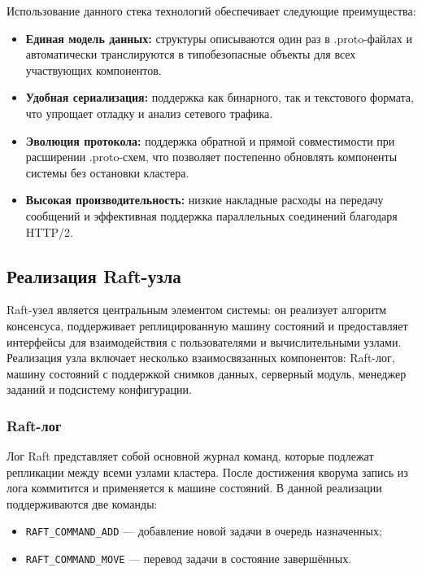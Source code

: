 Использование данного стека технологий обеспечивает следующие преимущества:
\begin{itemize}
    \item \textbf{Единая модель данных:} структуры описываются
    один раз в .proto-файлах и автоматически транслируются
    в типобезопасные объекты для всех участвующих компонентов.
    \item \textbf{Удобная сериализация:} поддержка как бинарного,
    так и текстового формата, что упрощает отладку и анализ
    сетевого трафика.
    \item \textbf{Эволюция протокола:} поддержка обратной и
    прямой совместимости при расширении .proto-схем, что позволяет
    постепенно обновлять компоненты системы без остановки кластера.
    \item \textbf{Высокая производительность:} низкие накладные расходы
    на передачу сообщений и эффективная поддержка параллельных
    соединений благодаря HTTP/2.
\end{itemize}

\subsection{Реализация Raft-узла}

Raft-узел является центральным элементом системы: он реализует алгоритм
консенсуса, поддерживает реплицированную машину состояний и предоставляет
интерфейсы для взаимодействия с пользователями и вычислительными узлами.
Реализация узла включает несколько взаимосвязанных компонентов: Raft-лог,
машину состояний с поддержкой снимков данных, серверный модуль, менеджер
заданий и подсистему конфигурации.

\subsubsection{Raft-лог}

Лог Raft представляет собой основной журнал команд, которые подлежат
репликации между всеми узлами кластера. После достижения кворума
запись из лога коммитится и применяется к машине состояний.
В данной реализации поддерживаются две команды:

\begin{itemize}
    \item \texttt{RAFT\_COMMAND\_ADD} — добавление новой задачи в очередь назначенных;
    \item \texttt{RAFT\_COMMAND\_MOVE} — перевод задачи в состояние завершённых.
\end{itemize}


